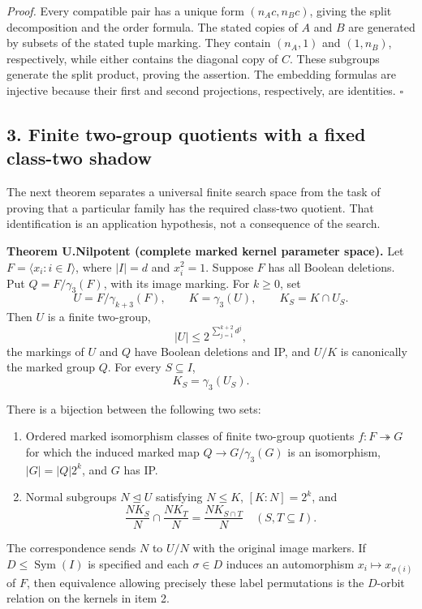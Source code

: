 \documentclass[
  11pt,
  a4paper,
]{article}
\providecommand{\tightlist}{%
  \setlength{\itemsep}{0pt}\setlength{\parskip}{0pt}}
\begin{document}
\emph{Proof.} Every compatible pair has a unique form \((n_Ac,n_Bc)\),
giving the split decomposition and the order formula. The stated copies
of \(A\) and \(B\) are generated by subsets of the stated tuple marking.
They contain \((n_A,1)\) and \((1,n_B)\), respectively, while either
contains the diagonal copy of \(C\). These subgroups generate the split
product, proving the assertion. The embedding formulas are injective
because their first and second projections, respectively, are
identities. \(\square\)

\subsection{3. Finite two-group quotients with a fixed class-two
shadow}\label{finite-two-group-quotients-with-a-fixed-class-two-shadow}

The next theorem separates a universal finite search space from the task
of proving that a particular family has the required class-two quotient.
That identification is an application hypothesis, not a consequence of
the search.

\textbf{Theorem U.Nilpotent (complete marked kernel parameter space).}
Let \(F=\langle x_i:i\in I\rangle\), where \(|I|=d\) and \(x_i^2=1\).
Suppose \(F\) has all Boolean deletions. Put \(Q=F/\gamma_3(F)\), with
its image marking. For \(k\geq0\), set \[
U=F/\gamma_{k+3}(F),\qquad K=\gamma_3(U),\qquad
K_S=K\cap U_S.
\tag{3.1}
\] Then \(U\) is a finite two-group, \[
|U|\leq 2^{\,\sum_{j=1}^{k+2}d^j},
\tag{3.2}
\] the markings of \(U\) and \(Q\) have Boolean deletions and IP, and
\(U/K\) is canonically the marked group \(Q\). For every
\(S\subseteq I\), \[
K_S=\gamma_3(U_S).
\tag{3.3}
\]

There is a bijection between the following two sets:

\begin{enumerate}
\def\labelenumi{\arabic{enumi}.}
\tightlist
\item
  Ordered marked isomorphism classes of finite two-group quotients
  \(f:F\twoheadrightarrow G\) for which the induced marked map
  \(Q\to G/\gamma_3(G)\) is an isomorphism, \(|G|=|Q|2^k\), and \(G\)
  has IP.
\item
  Normal subgroups \(N\unlhd U\) satisfying \(N\leq K\), \([K:N]=2^k\),
  and \[
  \frac{NK_S}{N}\cap\frac{NK_T}{N}
  =\frac{NK_{S\cap T}}{N}
  \quad(S,T\subseteq I).
  \tag{3.4}
  \]
\end{enumerate}

The correspondence sends \(N\) to \(U/N\) with the original image
markers. If \(D\leq\operatorname{Sym}(I)\) is specified and each
\(\sigma\in D\) induces an automorphism \(x_i\mapsto x_{\sigma(i)}\) of
\(F\), then equivalence allowing precisely these label permutations is
the \(D\)-orbit relation on the kernels in item 2.
\end{document}
